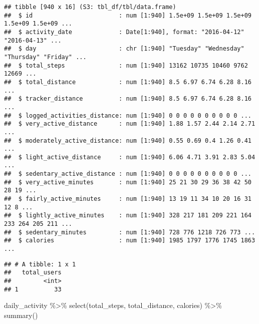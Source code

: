 \documentclass[
]{article}
\newenvironment{Shaded}{\begin{snugshade}}{\end{snugshade}}
\newcommand{\AttributeTok}[1]{\textcolor[rgb]{0.77,0.63,0.00}{#1}}
\newcommand{\CommentTok}[1]{\textcolor[rgb]{0.56,0.35,0.01}{\textit{#1}}}
\newcommand{\FunctionTok}[1]{\textcolor[rgb]{0.00,0.00,0.00}{#1}}
\newcommand{\NormalTok}[1]{#1}
\newcommand{\SpecialCharTok}[1]{\textcolor[rgb]{0.00,0.00,0.00}{#1}}
\begin{document}
\begin{verbatim}
## tibble [940 x 16] (S3: tbl_df/tbl/data.frame)
##  $ id                        : num [1:940] 1.5e+09 1.5e+09 1.5e+09 1.5e+09 1.5e+09 ...
##  $ activity_date             : Date[1:940], format: "2016-04-12" "2016-04-13" ...
##  $ day                       : chr [1:940] "Tuesday" "Wednesday" "Thursday" "Friday" ...
##  $ total_steps               : num [1:940] 13162 10735 10460 9762 12669 ...
##  $ total_distance            : num [1:940] 8.5 6.97 6.74 6.28 8.16 ...
##  $ tracker_distance          : num [1:940] 8.5 6.97 6.74 6.28 8.16 ...
##  $ logged_activities_distance: num [1:940] 0 0 0 0 0 0 0 0 0 0 ...
##  $ very_active_distance      : num [1:940] 1.88 1.57 2.44 2.14 2.71 ...
##  $ moderately_active_distance: num [1:940] 0.55 0.69 0.4 1.26 0.41 ...
##  $ light_active_distance     : num [1:940] 6.06 4.71 3.91 2.83 5.04 ...
##  $ sedentary_active_distance : num [1:940] 0 0 0 0 0 0 0 0 0 0 ...
##  $ very_active_minutes       : num [1:940] 25 21 30 29 36 38 42 50 28 19 ...
##  $ fairly_active_minutes     : num [1:940] 13 19 11 34 10 20 16 31 12 8 ...
##  $ lightly_active_minutes    : num [1:940] 328 217 181 209 221 164 233 264 205 211 ...
##  $ sedentary_minutes         : num [1:940] 728 776 1218 726 773 ...
##  $ calories                  : num [1:940] 1985 1797 1776 1745 1863 ...
\end{verbatim}

\begin{Shaded}
\end{Shaded}

\begin{verbatim}
## # A tibble: 1 x 1
##   total_users
##         <int>
## 1          33
\end{verbatim}

\begin{Shaded}
\begin{Highlighting}[]
\NormalTok{daily\_activity }\SpecialCharTok{\%\textgreater{}\%}
\FunctionTok{select}\NormalTok{(total\_steps,}
\NormalTok{total\_distance,}
\NormalTok{calories) }\SpecialCharTok{\%\textgreater{}\%}
\FunctionTok{summary}\NormalTok{()}
\end{Highlighting}
\end{Shaded}
\end{document}
